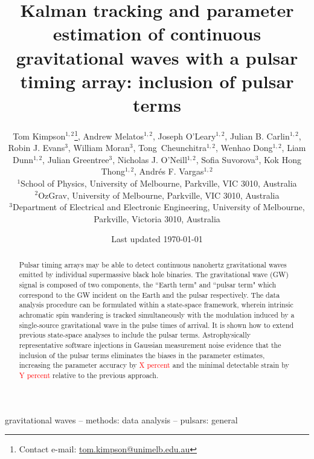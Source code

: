 \documentclass[fleqn,usenatbib,useAMS]{mnras}
\title[Kalman PTA]{Kalman tracking and parameter estimation of continuous gravitational waves with a pulsar timing array: inclusion of pulsar terms}
\author[Kimpson]{Tom Kimpson$^{1,2}$\thanks{Contact e-mail: \href{tom.kimpson@unimelb.edu.au}{tom.kimpson@unimelb.edu.au}}, Andrew Melatos$^{1,2}$, Joseph O'Leary$^{1,2}$, Julian B. Carlin$^{1,2}$, Robin J. Evans$^{3}$, \newauthor William Moran$^{3}$, Tong Cheunchitra$^{1,2}$, Wenhao Dong$^{1,2}$, Liam Dunn$^{1,2}$, Julian Greentree$^{3}$, Nicholas J. O'Neill$^{1,2}$, \newauthor Sofia Suvorova$^{3}$, Kok Hong Thong$^{1,2}$, Andrés F. Vargas$^{1,2}$%
\\
$^{1}$School of Physics, University of Melbourne, Parkville, VIC 3010, Australia \\
$^{2}$OzGrav, University of Melbourne, Parkville, VIC 3010, Australia \\
$^{3}$Department of Electrical and Electronic Engineering, University of Melbourne, Parkville, Victoria 3010, Australia }
\date{Last updated \today}
\begin{document}
\label{firstpage}
\pagerange{\pageref{firstpage}--\pageref{lastpage}}
\maketitle

\begin{abstract}	
	 Pulsar timing arrays may be able to detect continuous nanohertz gravitational waves emitted by individual supermassive black hole binaries. The gravitational wave (GW) signal is composed of two components, the ``Earth term" and ``pulsar term" which correspond to the GW incident on the Earth and the pulsar respectively. The data analysis procedure can be formulated within a state-space framework, wherein intrinsic achromatic spin wandering is tracked simultaneously with the modulation induced by a single-source gravitational wave in the pulse times of arrival. It is shown how to extend previous state-space analyses to include the pulsar terms. Astrophysically representative software injections in Gaussian measurement noise evidence that the inclusion of the pulsar terms eliminates the biases in the parameter estimates, increasing the parameter accuracy by \textcolor{red}{X percent} and the minimal detectable strain by \textcolor{red}{Y percent} relative to the previous approach.
\end{abstract}

\begin{keywords}
gravitational waves -- methods: data analysis -- pulsars: general
\end{keywords}



\begingroup
\let\clearpage\relax
\endgroup
\newpage
\end{document}
